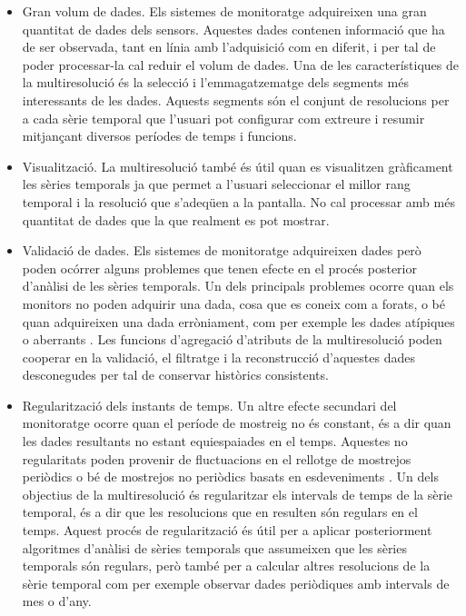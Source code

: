 \begin{itemize}

\item Gran volum de dades. Els sistemes de monitoratge adquireixen una
  gran quantitat de dades dels sensors. Aquestes dades contenen
  informació que ha de ser observada, tant en línia amb l'adquisició
  com en diferit, i per tal de poder processar-la cal reduir el volum
  de dades. Una de les característiques de la multiresolució és la
  selecció i l'emmagatzematge dels segments més interessants de les
  dades. Aquests segments són el conjunt de resolucions per a cada
  sèrie temporal que l'usuari pot configurar com extreure i resumir
  mitjançant diversos períodes de temps i funcions.

\item Visualització. La multiresolució també és útil quan es
  visualitzen gràficament les sèries temporals ja que permet a
  l'usuari seleccionar el millor rang temporal i la resolució que
  s'adeqüen a la pantalla. No cal processar amb més quantitat de dades que
  la que realment es pot mostrar.


\item Validació de dades. Els sistemes de monitoratge adquireixen
  dades però poden ocórrer alguns problemes que tenen efecte en el
  procés posterior d'anàlisi de les sèries temporals. Un dels
  principals problemes ocorre quan els monitors no poden adquirir una
  dada, cosa que es coneix com a forats, o bé quan adquireixen una
  dada erròniament, com per exemple les dades atípiques o
  aberrants \parencite{quevedo10}.  Les funcions d'agregació
  d'atributs de la multiresolució poden cooperar en la validació, el
  filtratge i la reconstrucció d'aquestes dades desconegudes per tal
  de conservar històrics consistents.

\item Regularització dels instants de temps. Un altre efecte secundari
  del monitoratge ocorre quan el període de mostreig no és constant,
  és a dir quan les dades resultants no estant equiespaiades en el
  temps. Aquestes no regularitats poden provenir de fluctuacions en el rellotge de mostrejos periòdics o bé de mostrejos no periòdics basats en esdeveniments 
  \parencite{kopetz11:realtime}. Un dels objectius de la
  multiresolució és regularitzar els intervals de temps de la sèrie
  temporal, és a dir que les resolucions que en resulten són regulars
  en el temps. Aquest procés de regularització és útil per a aplicar
  posteriorment algoritmes d'anàlisi de sèries temporals que
  assumeixen que les sèries temporals són regulars, però també per a
  calcular altres resolucions de la sèrie temporal com per exemple
  observar dades periòdiques amb intervals de mes o d'any.



\end{itemize}
